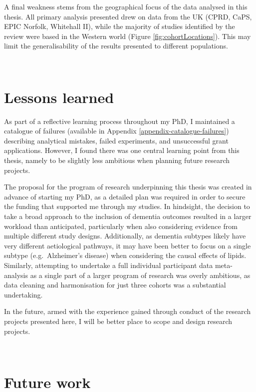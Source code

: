 \documentclass[a4paper, twoside]{templates/ociamthesis}
\begin{document}
A final weakness stems from the geographical focus of the data analysed in this thesis. All primary analysis presented drew on data from the UK (CPRD, CaPS, EPIC Norfolk, Whitehall II), while the majority of studies identified by the review were based in the Western world (Figure \ref{fig:cohortLocations}). This may limit the generalisability of the results presented to different populations.

~

\hypertarget{lessons-learned}{%
\section{Lessons learned}\label{lessons-learned}}

As part of a reflective learning process throughout my PhD, I maintained a catalogue of failures (available in Appendix \ref{appendix-catalogue-failures}) describing analytical mistakes, failed experiments, and unsuccessful grant applications. However, I found there was one central learning point from this thesis, namely to be slightly less ambitious when planning future research projects.

The proposal for the program of research underpinning this thesis was created in advance of starting my PhD, as a detailed plan was required in order to secure the funding that supported me through my studies. In hindsight, the decision to take a broad approach to the inclusion of dementia outcomes resulted in a larger workload than anticipated, particularly when also considering evidence from multiple different study designs. Additionally, as dementia subtypes likely have very different aetiological pathways, it may have been better to focus on a single subtype (e.g.~Alzheimer's disease) when considering the causal effects of lipids. Similarly, attempting to undertake a full individual participant data meta-analysis as a single part of a larger program of research was overly ambitious, as data cleaning and harmonisation for just three cohorts was a substantial undertaking.

In the future, armed with the experience gained through conduct of the research projects presented here, I will be better place to scope and design research projects.

~

\hypertarget{future-work-1}{%
\section{Future work}\label{future-work-1}}
\end{document}
